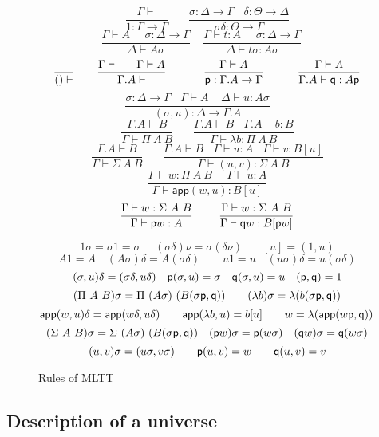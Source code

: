 \documentclass[10pt,a4paper]{article}
\newcommand{\app}{\mathsf{app}}
\newcommand{\pp}{{\sf p}}
\newcommand{\qq}{{\sf q}}
\begin{document}
\begin{figure}[t]
\caption{Rules of MLTT\label{MLTT}}
\centering
$$
\frac{\Gamma\vdash}{1:\Gamma\to \Gamma}~~~~~~~~
\frac{\sigma:\Delta\to\Gamma~~~~\delta:\Theta\to\Delta}
     {\sigma\delta:\Theta\to\Gamma}
$$
$$
\frac{\Gamma\vdash A~~~~~~\sigma:\Delta\to\Gamma}{\Delta\vdash A\sigma}~~~~~
\frac{\Gamma\vdash t:A~~~~~~\sigma:\Delta\to\Gamma}{\Delta\vdash t\sigma:A\sigma}~~~~~
$$
$$
\frac{}{()\vdash}~~~~~~
\frac{\Gamma\vdash~~~~~\Gamma\vdash A}{\Gamma.A\vdash}~~~~~~~~~~
\frac{\Gamma\vdash A}{\pp:\Gamma.A\to\Gamma}~~~~~~~~~
\frac{\Gamma\vdash A}{\Gamma.A\vdash \qq:A\pp}
$$
$$
\frac{\sigma:\Delta\to\Gamma~~~~\Gamma\vdash A~~~~~\Delta\vdash u:A\sigma}
     {(\sigma,u):\Delta\to\Gamma.A}~~~~~~~~
$$
$$
\frac{\Gamma.A\vdash B}{\Gamma\vdash\Pi~A~B}~~~~~~~~
\frac{\Gamma.A\vdash B~~~~\Gamma.A\vdash b:B}
     {\Gamma\vdash\lambda b:\Pi~A~B}
$$
$$
\frac{\Gamma.A\vdash B}{\Gamma\vdash\Sigma~A~B}~~~~~~~~
\frac{\Gamma.A\vdash B~~~~\Gamma\vdash u:A~~~~\Gamma\vdash v:B[u]}
     {\Gamma\vdash (u,v):\Sigma~A~B}
$$
$$
\frac{\Gamma\vdash w:\Pi~A~B~~~~~~\Gamma\vdash u:A}
     {\Gamma\vdash \app(w,u):B[u]}
$$
$$
\frac{\Gamma\vdash w:\Sigma~A~B}{\Gamma\vdash \pp w : A}~~~~~~~
\frac{\Gamma\vdash w:\Sigma~A~B}{\Gamma\vdash \qq w : B[\pp w]}
$$


\medskip

$$
{1\sigma = \sigma 1 = \sigma}~~~~~~{(\sigma\delta)\nu = \sigma(\delta\nu)}~~~~~~~~[u] = (1,u)
$$
$$
{A 1 = A \quad (A \sigma) \delta = A (\sigma \delta) \qquad  u 1 = u \quad
(u \sigma) \delta = u (\sigma \delta)}
$$
$$
{(\sigma,u)\delta = (\sigma\delta,u\delta)} \quad {\pp (\sigma,u) =
  \sigma} \quad {\qq(\sigma,u) = u} \quad (\pp, \qq) = 1
$$
$$
{(\Pi~A~B)\sigma = \Pi~(A\sigma)~(B(\sigma\pp,\qq))} \qquad
{(\lambda b) \sigma = \lambda (b (\sigma \pp, \qq))}
$$
$$
     {\app(w,u)\delta= \app(w\delta,u\delta)}\qquad
     {\app(\lambda b,u)= b[u]}\qquad
     {w = \lambda (\app(w \pp, \qq))} \qquad
$$
$$
(\Sigma~A~B)\sigma = \Sigma~(A\sigma)~(B(\sigma\pp,\qq)) \quad (\pp w)
\sigma = \pp (w \sigma) \quad (\qq w) \sigma = \qq (w \sigma)
$$
$$
(u, v) \sigma = (u \sigma, v \sigma) \qquad\pp (u,v) = w \qquad \qq
(u,v) = v
$$
\end{figure}

\subsection{Description of a universe}

\end{document}
